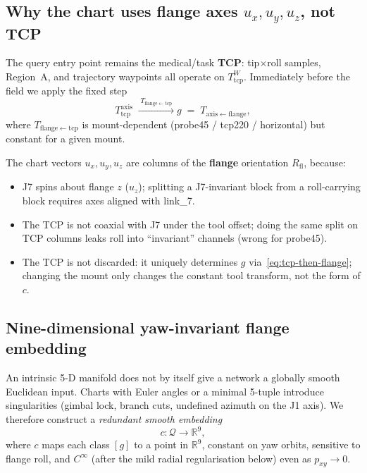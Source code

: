 \documentclass[11pt,a4paper]{article}
\newcommand{\R}{\mathbb{R}}
\begin{document}
\subsection{Why the chart uses flange axes \(u_{x},u_{y},u_{z}\), not TCP}
\label{sec:why-flange-not-tcp}

The query entry point remains the medical/task \textbf{TCP}: tip$\times$roll
samples, Region~A, and trajectory waypoints all operate on
\(T_{\mathrm{tcp}}^{W}\). Immediately before the field we apply the fixed step
\begin{equation}
\label{eq:tcp-then-flange}
  T_{\mathrm{tcp}}^{\mathrm{axis}}
  \;\xrightarrow{\;T_{\mathrm{flange\leftarrow tcp}}\;}
  g
  \;=\;
  T_{\mathrm{axis\leftarrow flange}},
\end{equation}
where \(T_{\mathrm{flange\leftarrow tcp}}\) is mount-dependent (probe45 /
tcp220 / horizontal) but constant for a given mount.

The chart vectors \(u_{x},u_{y},u_{z}\) are columns of the \textbf{flange}
orientation \(R_{\mathrm{fl}}\), because:
\begin{itemize}[leftmargin=1.4em]
  \item J7 spins about flange \(z\) (\(u_{z}\)); splitting a J7-invariant
        block from a roll-carrying block requires axes aligned with link\_7.
  \item The TCP is not coaxial with J7 under the tool offset; doing the same
        split on TCP columns leaks roll into ``invariant'' channels (wrong for
        probe45).
  \item The TCP is not discarded: it uniquely determines \(g\)
        via~\eqref{eq:tcp-then-flange}; changing the mount only changes the
        constant tool transform, not the form of \(c\).
\end{itemize}

\subsection{Nine-dimensional yaw-invariant flange embedding}
\label{sec:9d}

An intrinsic 5-D manifold does not by itself give a network a globally
smooth Euclidean input. Charts with Euler angles or a minimal 5-tuple
introduce singularities (gimbal lock, branch cuts, undefined azimuth on the
J1 axis). We therefore construct a \emph{redundant smooth embedding}
\begin{equation}
\label{eq:embedding-goal}
  c:\mathcal{Q}\longrightarrow\R^{9},
\end{equation}
where \(c\) maps each class \([g]\) to a point in \(\R^{9}\), constant on yaw
orbits, sensitive to flange roll, and \(C^{\infty}\) (after the mild radial
regularisation below) even as \(p_{xy}\to 0\).
\end{document}

